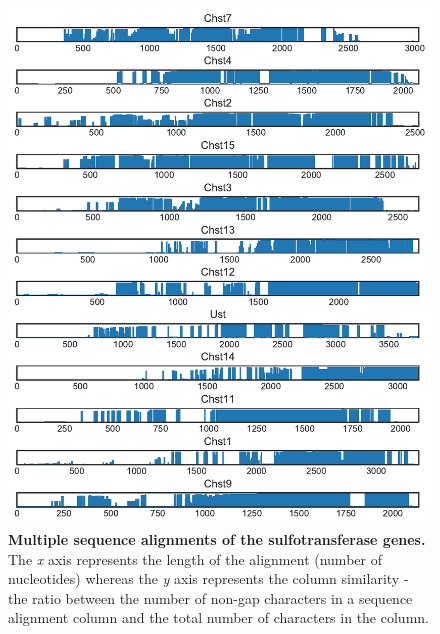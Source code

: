 \documentclass{article}
\begin{document}
\begin{figure}
\centering
\includegraphics[width=\textwidth]{./images/sulfotransferase_msa.pdf}
\caption{\textbf{Multiple sequence alignments of the sulfotransferase genes.} The \textit{x} axis represents the length of the alignment (number of nucleotides) whereas the \textit{y} axis represents the column similarity - the ratio between the number of non-gap characters in a sequence alignment column and the total number of characters in the column.}
\label{msa_fig_6}
\end{figure}
\end{document}
